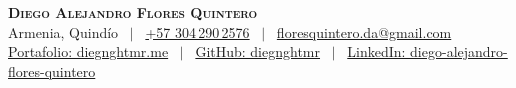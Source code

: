 \begin{center}
    \textbf{\Huge \scshape Diego Alejandro Flores Quintero} \\ \vspace{1pt}
    Armenia, Quindío \ $|$ \
    \href{http://wa.me/+573042902576}{+57 304\,290\,2576} \ $|$ \
    \href{mailto:floresquintero.da@gmail.com}{floresquintero.da@gmail.com} \\[1pt]
    \href{https://www.diegnghtmr.me}{Portafolio: diegnghtmr.me} \ $|$ \
    \href{https://github.com/diegnghtmr}{GitHub: diegnghtmr} \ $|$ \
    \href{https://www.linkedin.com/in/diego-alejandro-flores-quintero/}{LinkedIn: diego-alejandro-flores-quintero}
\end{center}
